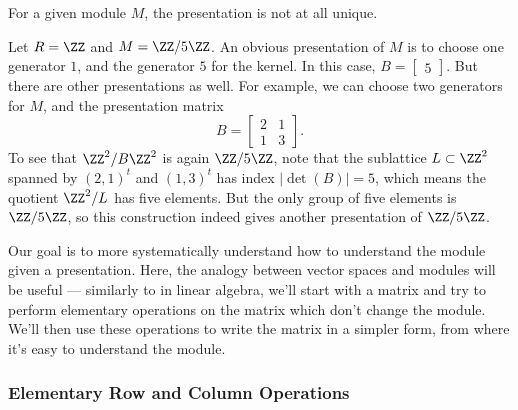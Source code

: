 For a given module $M$, the presentation is not at all unique. 

\begin{example}
Let $R = \ZZ$ and $M = \ZZ/5\ZZ$. An obvious presentation of $M$ is to choose one generator $1$, and the generator $5$ for the kernel. In this case, $B = \begin{bmatrix} 5 \end{bmatrix}$. 
But there are other presentations as well. For example, we can choose two generators for $M$, and the presentation matrix \[B = \begin{bmatrix} 2 & 1 \\ 1 & 3 \end{bmatrix}.\] To see that $\ZZ^2/B\ZZ^2$ is again $\ZZ/5\ZZ$, note that the sublattice $L \subset \ZZ^2$ spanned by $(2, 1)^t$ and $(1, 3)^t$ has index $\lvert \det(B) \rvert = 5$, which means the quotient $\ZZ^2/L$ has five elements. But the only group of five elements is $\ZZ/5\ZZ$, so this construction indeed gives another presentation of $\ZZ/5\ZZ$. 

\end{example}

Our goal is to more systematically understand how to understand the module given a presentation. Here, the analogy between vector spaces and modules will be useful --- similarly to in linear algebra, we'll start with a matrix and try to perform elementary operations on the matrix which don't change the module. We'll then use these operations to write the matrix in a simpler form, from where it's easy to understand the module. 


\subsubsection{Elementary Row and Column Operations}

